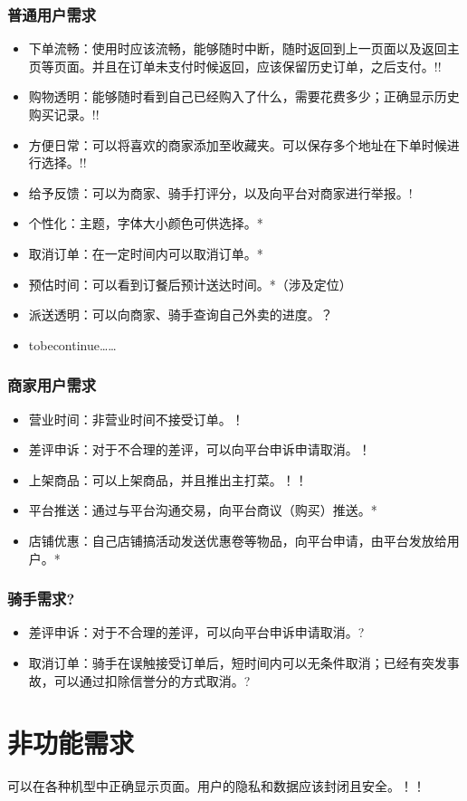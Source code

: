 \subsubsection{普通用户需求}
\begin{itemize}
    \item{下单流畅}：使用时应该流畅，能够随时中断，随时返回到上一页面以及返回主页等页面。并且在订单未支付时候返回，应该保留历史订单，之后支付。!!
    \item{购物透明}：能够随时看到自己已经购入了什么，需要花费多少；正确显示历史购买记录。!!
    \item{方便日常}：可以将喜欢的商家添加至收藏夹。可以保存多个地址在下单时候进行选择。!!
    \item{给予反馈}：可以为商家、骑手打评分，以及向平台对商家进行举报。!
    
    \item {个性化}：主题，字体大小颜色可供选择。*
    \item {取消订单}：在一定时间内可以取消订单。*
    \item{预估时间}：可以看到订餐后预计送达时间。*（涉及定位）
    
    \item {派送透明}：可以向商家、骑手查询自己外卖的进度。？
    \item{tobecontinue}……
\end{itemize}

\subsubsection{商家用户需求}
\begin{itemize}
    \item {营业时间}：非营业时间不接受订单。！
    \item {差评申诉}：对于不合理的差评，可以向平台申诉申请取消。！
    \item {上架商品}：可以上架商品，并且推出主打菜。！！
    
    \item{平台推送}：通过与平台沟通交易，向平台商议（购买）推送。*
    \item {店铺优惠}：自己店铺搞活动发送优惠卷等物品，向平台申请，由平台发放给用户。*
\end{itemize}

\subsubsection{骑手需求?}
\begin{itemize}
    \item {差评申诉}：对于不合理的差评，可以向平台申诉申请取消。?
    \item {取消订单}：骑手在误触接受订单后，短时间内可以无条件取消；已经有突发事故，可以通过扣除信誉分的方式取消。?
\end{itemize}


\section{非功能需求}
可以在各种机型中正确显示页面。用户的隐私和数据应该封闭且安全。！！

